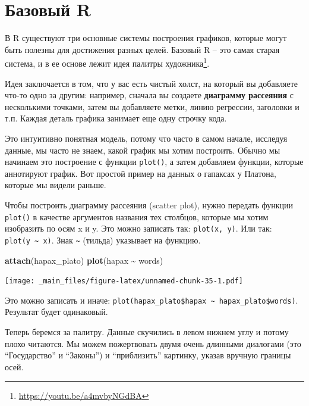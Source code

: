 \documentclass[
]{book}
\newenvironment{Shaded}{\begin{snugshade}}{\end{snugshade}}
\newcommand{\FunctionTok}[1]{\textcolor[rgb]{0.13,0.29,0.53}{\textbf{#1}}}
\newcommand{\NormalTok}[1]{#1}
\newcommand{\SpecialCharTok}[1]{\textcolor[rgb]{0.81,0.36,0.00}{\textbf{#1}}}
\theoremstyle{definition}
\theoremstyle{definition}
\theoremstyle{definition}
\theoremstyle{definition}
\theoremstyle{remark}
\begin{document}
\hypertarget{ux431ux430ux437ux43eux432ux44bux439-r}{%
\section{Базовый R}\label{ux431ux430ux437ux43eux432ux44bux439-r}}

В R существуют три основные системы построения графиков, которые могут быть полезны для достижения разных целей. Базовый R -- это самая старая система, и в ее основе лежит идея палитры художника\footnote{\url{https://youtu.be/a4mvbyNGdBA}}.

Идея заключается в том, что у вас есть чистый холст, на который вы добавляете что-то одно за другим: например, сначала вы создаете \textbf{диаграмму рассеяния} с несколькими точками, затем вы добавляете метки, линию регрессии, заголовки и т.п. Каждая деталь графика занимает еще одну строчку кода.

Это интуитивно понятная модель, потому что часто в самом начале, исследуя данные, мы часто не знаем, какой график мы хотим построить. Обычно мы начинаем это построение с функции \texttt{plot()}, а затем добавляем функции, которые аннотируют график. Вот простой пример на данных о гапаксах у Платона, которые мы видели раньше.

Чтобы построить диаграмму рассеяния (scatter plot), нужно передать функции \texttt{plot()} в качестве аргументов названия тех столбцов, которые мы хотим изобразить по осям x и y. Это можно записать так: \texttt{plot(x,\ y)}. Или так: \texttt{plot(y\ \textasciitilde{}\ x)}. Знак \texttt{\textasciitilde{}} (тильда) указывает на функцию.

\begin{Shaded}
\begin{Highlighting}[]
\FunctionTok{attach}\NormalTok{(hapax\_plato)}
\FunctionTok{plot}\NormalTok{(hapax }\SpecialCharTok{\textasciitilde{}}\NormalTok{ words)}
\end{Highlighting}
\end{Shaded}

\texttt{[image: \_main\_files/figure-latex/unnamed-chunk-35-1.pdf]}

Это можно записать и иначе: \texttt{plot(hapax\_plato\$hapax\ \textasciitilde{}\ hapax\_plato\$words)}. Результат будет одинаковый.

Теперь беремся за палитру. Данные скучились в левом нижнем углу и потому плохо читаются. Мы можем пожертвовать двумя очень длинными диалогами (это ``Государство'' и ``Законы'') и ``приблизить'' картинку, указав вручную границы осей.
\end{document}

